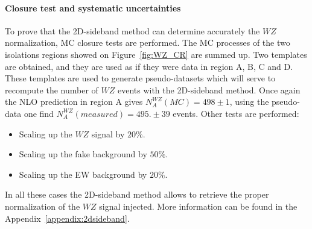 \paragraph{Closure test and systematic uncertainties}


To prove that the 2D-sideband method can determine accurately the $WZ$ normalization, MC closure tests are performed. The MC processes of the two isolations regions showed on Figure~\ref{fig:WZ_CR} are summed up. Two templates are obtained, and they are used as if they were data in region A, B, C and D. These templates are used to generate pseudo-datasets which will serve to recompute the number of $WZ$ events with the 2D-sideband method.
Once again the NLO prediction in region A gives $N_A^{WZ}(MC)= 498 \pm 1$, using the pseudo-data one find $N_A^{WZ}(measured)=495.\pm{}39$ events. Other tests are performed: 

\begin{itemize}
\item Scaling up the $WZ$ signal by $20\%$.
\item Scaling up the fake background by $50\%$.
\item Scaling up the EW background by $20\%$.
\end{itemize}

In all these cases the 2D-sideband method allows to retrieve the proper normalization of the $WZ$ signal injected. More information can be found in the Appendix~\ref{appendix:2dsideband}.



